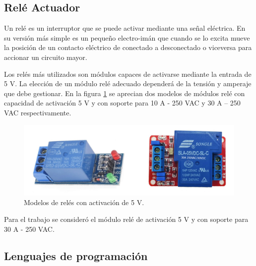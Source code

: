 



\subsection{Relé Actuador}

Un relé es un interruptor que se puede activar mediante una señal eléctrica. En su versión más simple es un pequeño electro-imán que cuando se lo excita mueve la posición de un contacto eléctrico de conectado a desconectado o viceversa para accionar un circuito mayor. 

Los relés más utilizados son módulos capaces de activarse mediante la entrada de 5 V. La elección de un módulo relé adecuado dependerá de la tensión y amperaje que debe gestionar. En la figura \ref{fig:rele} se aprecian dos modelos de módulos relé con capacidad de activación 5 V y con soporte para 10 A - 250 VAC y 30 A – 250 VAC respectivamente.


\begin{figure}[htbp]
	\centering
	\includegraphics[width=1.0\textwidth]{./Figures/rele.jpg}
	\caption{Modelos de relés con activación de 5 V.}

	\label{fig:rele}
\end{figure}


Para el trabajo se consideró el módulo relé de activación 5 V y con soporte para 30 A - 250 VAC.

\subsection{Lenguajes de programación}

